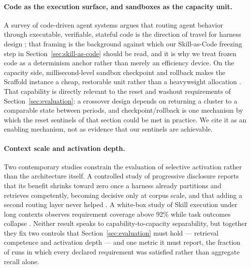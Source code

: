 \paragraph{Code as the execution surface, and sandboxes as the capacity unit.}
A survey of code-driven agent systems argues that routing agent behavior through executable, verifiable, stateful code is the direction of travel for harness design \cite{ning2026codeharness}; that framing is the background against which our Skill-as-Code freezing step in Section~\ref{sec:skill-as-code} should be read, and it is why we treat frozen code as a determinism anchor rather than merely an efficiency device. On the capacity side, millisecond-level sandbox checkpoint and rollback makes the Scaffold instance a cheap, restorable unit rather than a heavyweight allocation \cite{dong2026deltabox}. That capability is directly relevant to the reset and washout requirements of Section~\ref{sec:evaluation}: a crossover design depends on returning a cluster to a comparable state between periods, and checkpoint/rollback is one mechanism by which the reset sentinels of that section could be met in practice. We cite it as an enabling mechanism, not as evidence that our sentinels are achievable.

\paragraph{Context scale and activation depth.}
Two contemporary studies constrain the evaluation of selective activation rather than the architecture itself. A controlled study of progressive disclosure reports that its benefit shrinks toward zero once a harness already partitions and retrieves competently, becoming decisive only at corpus scale, and that adding a second routing layer never helped \cite{he2026disclosure}. A white-box study of Skill execution under long contexts observes requirement coverage above 92\% while task outcomes collapse \cite{xue2026longcontext}. Neither result speaks to capability-to-capacity separability, but together they fix two controls that Section~\ref{sec:evaluation} must hold --- retrieval competence and activation depth --- and one metric it must report, the fraction of runs in which every declared requirement was satisfied rather than aggregate recall alone.

